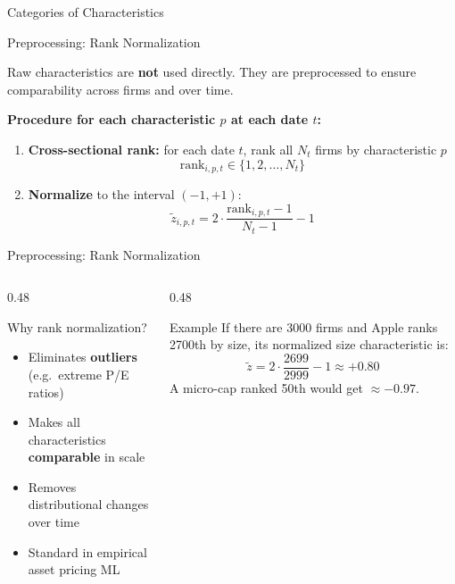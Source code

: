 \documentclass[aspectratio=169, 10pt]{beamer}
\begin{document}
\begin{frame}{Categories of Characteristics}
\medskip

\end{frame}
%
%
\begin{frame}{Preprocessing: Rank Normalization}

Raw characteristics are \textbf{not} used directly. They are preprocessed to ensure
comparability across firms and over time.

\bigskip
\textbf{Procedure for each characteristic $p$ at each date $t$:}

\begin{enumerate}
  \item \textbf{Cross-sectional rank:} for each date $t$, rank all $N_t$ firms by
        characteristic $p$
        $$\text{rank}_{i,p,t} \in \{1, 2, \ldots, N_t\}$$

  \item \textbf{Normalize} to the interval $(-1, +1)$:
        $$\tilde{z}_{i,p,t} = 2\cdot\frac{\text{rank}_{i,p,t} - 1}{N_t - 1} - 1$$
\end{enumerate}
\end{frame}
%
%
\begin{frame}{Preprocessing: Rank Normalization}
\begin{columns}
\begin{column}{0.48\textwidth}
  \begin{alertblock}{Why rank normalization?}
    \begin{itemize}
      \item Eliminates \textbf{outliers} (e.g.\ extreme P/E ratios)
      \item Makes all characteristics \textbf{comparable} in scale
      \item Removes distributional changes over time
      \item Standard in empirical asset pricing ML
    \end{itemize}
  \end{alertblock}
\end{column}
\begin{column}{0.48\textwidth}
  \begin{exampleblock}{Example}
    \small If there are 3000 firms and Apple ranks 2700th by size,
    its normalized size characteristic is:
    $$\tilde{z} = 2\cdot\frac{2699}{2999} - 1 \approx +0.80$$
    A micro-cap ranked 50th would get $\approx -0.97$.
  \end{exampleblock}
\end{column}
\end{columns}

\end{frame}
\end{document}
